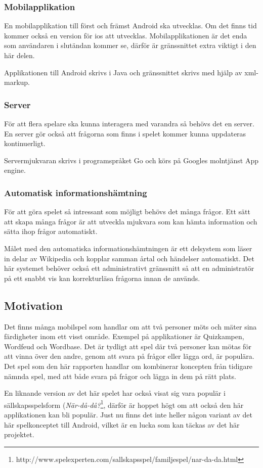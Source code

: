 \documentclass[12pt,a4paper]{article}
\begin{document}
\subsubsection{Mobilapplikation}
En mobilapplikation till först och främst Android ska utvecklas. Om det finns tid kommer också en version för ios att utvecklas. Mobilapplikationen är det enda som användaren i slutändan kommer se, därför är gränssnittet extra viktigt i den här delen. 

Applikationen till Android skrivs i Java och gränssnittet skrivs med hjälp av xml-markup.
\subsubsection{Server}
För att flera spelare ska kunna interagera med varandra så behövs det en server. En server gör också att frågorna som finns i spelet kommer kunna uppdateras kontinuerligt.

Servermjukvaran skrivs i programspråket Go och körs på Googles molntjänst App engine.

\subsubsection{Automatisk informationshämtning}
För att göra spelet så intressant som möjligt behövs det många frågor. Ett sätt att skapa många frågor är att utveckla mjukvara som kan hämta information och sätta ihop frågor automatiskt. 

Målet med den automatiska informationshämtningen är ett delsystem som läser in delar av Wikipedia och kopplar samman årtal och händelser automatiskt. Det här systemet behöver också ett administrativt gränssnitt så att en administratör på ett snabbt vis kan korrekturläsa frågorna innan de används.
\subsection{Motivation}
Det finns många mobilspel som handlar om att två personer möts och mäter sina färdigheter inom ett visst område. Exempel på applikationer är Quizkampen, Wordfeud och Wordbase. Det är tydligt att spel där två personer kan mötas för att vinna över den andre, genom att svara på frågor eller lägga ord, är populära. Det spel som den här rapporten handlar om kombinerar koncepten från tidigare nämnda spel, med att både svara på frågor och lägga in dem på rätt plats. 

En liknande version av det här spelet har också visat sig vara populär i sällskapsspelsform (\textit{När-då-då?}\footnote{http://www.spelexperten.com/sallskapsspel/familjespel/nar-da-da.html}, därför är hoppet högt om att också den här applikationen kan bli populär. Just nu finns det inte heller någon variant av det här spelkonceptet till Android, vilket är en lucka som kan täckas av det här projektet.
\end{document}
